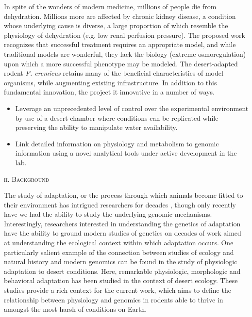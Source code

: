 \documentclass[11pt]{article}
\begin{document}
In spite of the wonders of modern medicine, millions of people die from dehydration. Millions more are affected by chronic kidney disease, a condition whose underlying cause is diverse, a large proportion of which resemble the physiology of dehydration (e.g. low renal perfusion pressure). The proposed work recognizes that successful treatment requires an appropriate model, and while traditional models are wonderful, they lack the biology (extreme osmoregulation) upon which a more successful phenotype may be modeled. The desert-adapted rodent \textit{P. eremicus} retains many of the beneficial characteristics of model organisms, while augmenting existing infrastructure. In addition to this fundamental innovation, the project it innovative in a number of ways.
\begin{itemize}
\item Leverage an unprecedented level of control over the experimental environment by use of a desert chamber where conditions can be replicated while preserving the ability to manipulate water availability. 
\item Link detailed information on physiology and metabolism to genomic information using a novel analytical tools under active development in the lab.

\end{itemize}

 

\newpage


\begin{center}
\textsc{{ii. Background}} \\
\end{center}
The study of adaptation, or the process through which animals become fitted to their environment has intrigued researchers for decades \citep{Darwin:1859tm, Fisher:1930wy}, though only recently have we had the ability to study the underlying genomic mechanisms. Interestingly, researchers interested in understanding the genetics of adaptation have the ability to ground modern studies of genetics on decades of work aimed at understanding the ecological context within which adaptation occurs. One particularly salient example of the connection between studies of ecology and natural history and modern genomics can be found in the study of physiologic adaptation to desert conditions. Here, remarkable physiologic, morphologic \citep{Dickinson:2007jn,Huntley:1984us,SchmidtNielsen:1950wg,SchmidtNielsen:1952wp} and behavioral \citep{NAGY:1994vd} adaptation has been studied in the context of desert ecology. These studies provide a rich context for the current work, which aims to define the relationship between physiology and genomics in rodents able to thrive in amongst the most harsh of conditions on Earth.  
\end{document}
